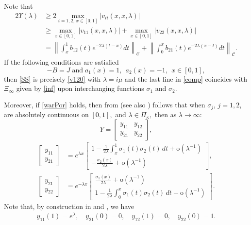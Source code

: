 \documentclass[11pt]{amsart}
\theoremstyle{plain}
\theoremstyle{definition}
\theoremstyle{remark}
\numberwithin{equation}{section}
\begin{document}
Note that
\begin{align}
2\Upsilon(\lambda)&\ge 2\max_{i=1,2,\,x\in [0,1]}|v_{ii}(x,x,\lambda)|
\label{comp}\\
&\ge \max_{x\in [0,1]}|v_{11}(x,x,\lambda)|+\max_{x\in [0,1]}|v_{22}(x,x,\lambda)|
\nonumber\\
&=\left\|\int_x^1 b_{12}(t)e^{-2\lambda(t-x)}dt\right\|_{\mathcal{C}}
+\left\|\int_0^x b_{21}(t)e^{-2\lambda(x-t)}dt \right\|_{\mathcal{C}}\nonumber.
\end{align}
If the following conditions are satisfied
\begin{equation}\label{warPor}
-B=J \; \mbox{and} \;  a_1(x)=1, \ \ a_2(x)=-1, \ \ x\in [0,1],
\end{equation}
then \eqref{SS}
is precisely \eqref{v120} with $\lambda=i\mu$ and the last line in \eqref{comp} coincides with
$\Xi_\infty$ given by \eqref{inf} upon interchanging functions $\sigma_1$ and $\sigma_2$.

Moreover, if \eqref{warPor} holds, then from \cite[Thm. 1]{SaKos} (see also \cite[Cor. 2]{SaKos21}) follows that when $\sigma_j$, $j=1,2$, are absolutely continuous on $[0,1],$
and $\lambda\in \Pi_\kappa,$ then as $\lambda\to \infty:$
\begin{equation}\label{SKAs}
Y=\left[\begin{array}{cc}
y_{11} & y_{12}\\
y_{21} & y_{22}
\end{array}\right],
\end{equation}
\begin{align*}
\left[\begin{array}{c}
y_{11} \\
y_{21}
\end{array}\right]&=e^{\lambda x}\left[\begin{array}{c}
1-\frac{1}{2\lambda}\int_x^1\sigma_1(t)\sigma_2(t)\,dt+\mbox{o}(\lambda^{-1})
\\
-\frac{\sigma_2(x)}{2\lambda}+\mbox{o}(\lambda^{-1})
\end{array}\right],
\\
\left[\begin{array}{c}
y_{21} \\
y_{22}
\end{array}\right]&=e^{-\lambda x}\left[\begin{array}{c}
\frac{\sigma_1(x)}{2\lambda}+\mbox{o}(\lambda^{-1})\\
1-\frac{1}{2\lambda}\int_0^x \sigma_1(t)\sigma_2(t)\,dt+\mbox{o}(\lambda^{-1})
\end{array}\right].
\end{align*}
Note that, by construction in \cite{SaKos21} and \cite{SaKos}, we have
\begin{align}\label{warPoczS}
 y_{11}(1)=e^\lambda,\quad y_{21}(0)=0,
\quad y_{12}(1)=0,\quad y_{22}(0)=1.
\end{align}
\end{document}
